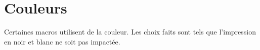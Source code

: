 \documentclass[12pt,a4paper]{book}
\begin{document}
\section{Couleurs}

Certaines macros utilisent de la couleur. Les choix faits sont tels que l'impression en noir et blanc ne soit pas impactée.
\end{document}
